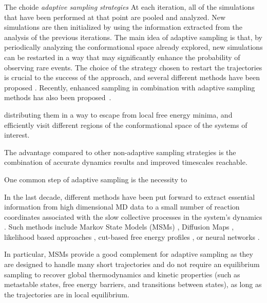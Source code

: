 The choide \emph{adaptive sampling strategies}
At each iteration, all of the simulations that have been performed at that
point are pooled and analyzed. New simulations are then initialized by
using the information extracted from the analysis of the previous iterations.
The main idea of adaptive sampling is that, by periodically analyzing the
conformational space already explored, new simulations can be restarted 
in a way that may significantly enhance the probability of observing rare
events. The choice of the strategy chosen to restart the trajectories is crucial
to the success of the approach, and several different methods have been
proposed \cite{weber2011characterization, Fabritiis-2014,
AdaptivePELE-Lecina2017,preto2014fast, doerr2016htmd,roblitz2013fuzzy,
weexplore, WESTPA-Zwier2015}.
Recently, enhanced sampling in combination with adaptive sampling methods has
also been proposed~\cite{pathreweight5}.




 distributing them in a way to 
escape from local free energy minima, and efficiently visit different regions of
the conformational space of the systems of interest.

The advantage compared to other non-adaptive sampling strategies is the combination of accurate dynamics results and improved timescales reachable.

One common step of adaptive sampling is the necessity to 

 In the last decade, different methods have been
put forward to extract essential information from high dimensional MD data to a
small number of reaction coordinates associated with the slow
collective processes in the system's dynamics \cite{rohrdanz2013discovering,
noe2017collective}. Such methods include Markov State Models (MSMs) \cite{prinz2011markov,
MSM-Pande-2018,bookmsm,masterequationsMSM,SCHUTTE1999146}, Diffusion Maps
\cite{Coifman7426, rohrdanz2011determination,Zheng2011, Boninsegna2015}, likelihood based approaches
\cite{peters2006obtaining}, cut-based free energy profiles
\cite{krivov2008diffusive}, or neural networks \cite{Mardt2018,wehmeyer2018time,
ribeiro2018reweighted}.  

In particular, MSMs provide a good complement for
adaptive sampling as they are designed to handle many short trajectories and
do not require an equilibrium sampling to recover global thermodynamics and
kinetic properties (such as metastable states, free energy barriers, and
transitions between states), as long as the trajectories are in local
equilibrium.  

